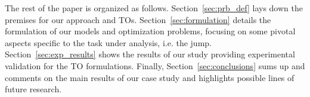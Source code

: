 The rest of the paper is organized as follows. Section~\ref{sec:prb_def} 
lays down the premises for our approach and TOs. Section~\ref{sec:formulation} details the formulation of our models and optimization problems, focusing on some pivotal aspects specific to the task under analysis, i.e. the jump. Section~\ref{sec:exp_results} shows the results of our study providing experimental validation for the TO formulations. Finally, Section~\ref{sec:conclusions} sums up and comments on the main results of our case study and highlights possible lines of future research.  
